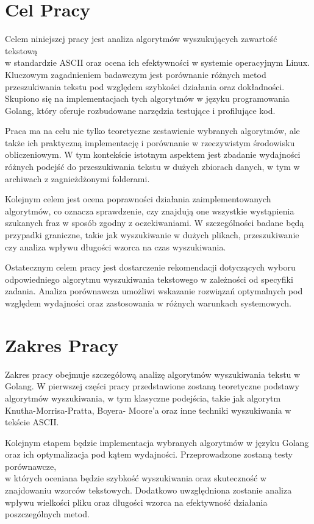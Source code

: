 \section{Cel Pracy}

Celem niniejszej pracy jest analiza algorytmów wyszukujących zawartość tekstową \\
w standardzie ASCII oraz ocena ich efektywności w systemie operacyjnym Linux. 
Kluczowym zagadnieniem badawczym jest porównanie różnych metod przeszukiwania 
tekstu pod względem szybkości działania oraz dokładności. Skupiono się na 
implementacjach tych algorytmów w języku programowania Golang, który oferuje
rozbudowane narzędzia testujące i profilujące kod.

Praca ma na celu nie tylko teoretyczne zestawienie wybranych algorytmów, ale 
także ich praktyczną implementację i porównanie w rzeczywistym środowisku 
obliczeniowym. W tym kontekście istotnym aspektem jest zbadanie wydajności 
różnych podejść do przeszukiwania tekstu w dużych zbiorach danych, w tym w 
archiwach z zagnieżdżonymi folderami.

Kolejnym celem jest ocena poprawności działania zaimplementowanych algorytmów, 
co oznacza sprawdzenie, czy znajdują one wszystkie wystąpienia szukanych fraz w 
sposób zgodny z oczekiwaniami. W szczególności badane będą przypadki graniczne, 
takie jak wyszukiwanie w dużych plikach, przeszukiwanie czy analiza wpływu 
długości wzorca na czas wyszukiwania.

Ostatecznym celem pracy jest dostarczenie rekomendacji dotyczących wyboru 
odpowiedniego algorytmu wyszukiwania tekstowego w zależności od specyfiki 
zadania. Analiza porównawcza umożliwi wskazanie rozwiązań optymalnych pod 
względem wydajności oraz zastosowania w różnych warunkach systemowych.

\section{Zakres Pracy}
Zakres pracy obejmuje szczegółową analizę algorytmów wyszukiwania tekstu w Golang.
W pierwszej części pracy przedstawione zostaną teoretyczne podstawy algorytmów wyszukiwania,
w tym klasyczne podejścia, takie jak algorytm Knutha-Morrisa-Pratta, Boyera-
Moore'a oraz inne techniki wyszukiwania w tekście ASCII.

Kolejnym etapem będzie implementacja wybranych algorytmów w języku Golang oraz 
ich optymalizacja pod kątem wydajności. Przeprowadzone zostaną testy porównawcze, \\
w których oceniana będzie szybkość wyszukiwania oraz skuteczność w znajdowaniu
wzorców tekstowych. Dodatkowo uwzględniona zostanie analiza wpływu wielkości
pliku oraz długości wzorca na efektywność działania poszczególnych metod.

